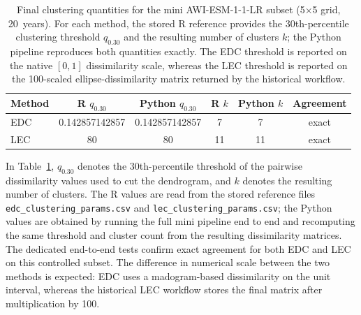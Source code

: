 \documentclass[preprint,12pt,a4paper]{elsarticle}
\begin{document}
{\begin{table}[!htbp]
\centering
\small
\setlength{\tabcolsep}{4pt}
\begin{tabular*}{\textwidth}{@{\extracolsep{\fill}}lccccc@{}}
\toprule
\textbf{Method} & \textbf{R $q_{0.30}$} & \textbf{Python $q_{0.30}$} &
  \textbf{R $k$} & \textbf{Python $k$} & \textbf{Agreement} \\
\midrule
EDC & 0.142857142857 & 0.142857142857 & 7 & 7 & exact \\
LEC & 80 & 80 & 11 & 11 & exact \\
\bottomrule
\end{tabular*}
\caption{Final clustering quantities for the mini AWI-ESM-1-1-LR
  subset (5$\times$5 grid, 20~years). For each method, the stored R
  reference provides the 30th-percentile clustering threshold
  $q_{0.30}$ and the resulting number of clusters $k$; the Python
  pipeline reproduces both quantities exactly. The EDC threshold is
  reported on the native $[0,1]$ dissimilarity scale, whereas the LEC
  threshold is reported on the 100-scaled ellipse-dissimilarity matrix
  returned by the historical workflow.}
\label{tab:mini-results}
\end{table}

In Table~\ref{tab:mini-results}, $q_{0.30}$ denotes the
30th-percentile threshold of the pairwise dissimilarity values used
to cut the dendrogram, and $k$ denotes the resulting number of
clusters. The R values are read from the stored reference files
\texttt{edc\_clustering\_params.csv} and
\texttt{lec\_clustering\_params.csv}; the Python values are obtained
by running the full mini pipeline end to end and recomputing the same
threshold and cluster count from the resulting dissimilarity matrices.
The dedicated end-to-end tests confirm exact agreement for both EDC
and LEC on this controlled subset. The difference in numerical scale
between the two methods is expected: EDC uses a madogram-based
dissimilarity on the unit interval, whereas the historical LEC
workflow stores the final matrix after multiplication by 100.

}
\end{document}
